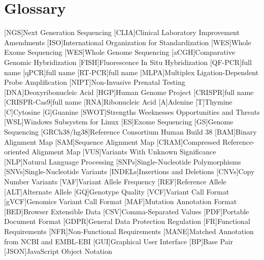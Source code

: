 \chapter{Glossary}

\footnotesize
\SingleSpacing

\begin{multicols}{2}
\begin{acronym}[AAAAAA]

	[NGS]{Next Generation Sequencing}
	[CLIA]{Clinical Laboratory Improvement Amendments}
	[ISO]{International Organization for Standardization}
	[WES]{Whole Exome Sequencing}
	[WES]{Whole Genome Sequencing}
	[aCGH]{Comparative Genomic Hybridization}
	[FISH]{Fluorescence In Situ Hybridization}
	[QF-PCR]{full name}
	[qPCR]{full name}
	[RT-PCR]{full name}
	[MLPA]{Multiplex Ligation-Dependent Probe Amplification}
	[NIPT]{Non-Invasive Prenatal Testing}
	[DNA]{Deoxyribonucleic Acid}
	[HGP]{Human Genome Project}
	[CRISPR]{full name}
	[CRISPR-Cas9]{full name}
	[RNA]{Ribonucleic Acid}
	{Adenine}
	{Thymine}
	{Cytosine}
	{Guanine}
	[SWOT]{Strengths Weeknesses Opportunities and Threats}
	[WSL]{Windows Subsystem for Linux}
	[ES]{Exome Sequencing}
	[GS]{Genome Sequencing}
	[GRCh38/hg38]{Reference Consortium Human Build 38}
	[BAM]{Binary Alignment Map}
	[SAM]{Sequence Alignment Map}
	[CRAM]{Compressed Reference-oriented Alignment Map}
	[VUS]{Variants With Unknown Significance}
	[NLP]{Natural Language Processing}
	[SNPs]{Single-Nucleotide Polymorphisms}
	[SNVs]{Single-Nucleotide Variants}
	[INDELs]{Insertions and Deletions}
	[CNVs]{Copy Number Variants}
	[VAF]{Variant Allele Frequency}
	[REF]{Reference Allele}
	[ALT]{Alternate Allele}
	[GQ]{Genotype Quality}
	[VCF]{Variant Call Format}
	[gVCF]{Genomics Variant Call Format}
	[MAF]{Mutation Annotation Format}
	[BED]{Browser Extensible Data}
	[CSV]{Comma-Separated Values}
	[PDF]{Portable Document Format}
	[GDPR]{General Data Protection Regulation}
	[FR]{Functional Requirements}
	[NFR]{Non-Functional Requirements}
	[MANE]{Matched Annotation from NCBI and EMBL-EBI}
	[GUI]{Graphical User Interface}
	[BP]{Base Pair}
	[JSON]{JavaScript Object Notation}


\end{acronym}
\end{multicols}

